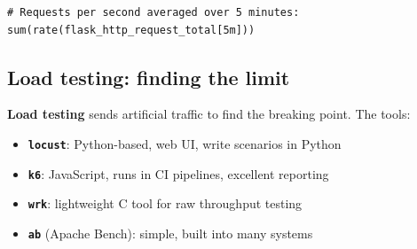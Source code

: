 \begin{outputbox}[short]
\begin{Verbatim}[fontsize=\codesize, breaklines, breakanywhere, breaksymbolleft={\tiny\textcolor{muted}{$\hookrightarrow$}}]
# Requests per second averaged over 5 minutes:
sum(rate(flask_http_request_total[5m]))
\end{Verbatim}
\end{outputbox}

\subsection*{Load testing: finding the limit}\label{36-scaling-load:load-testing-finding-the-limit}

\textbf{Load testing} sends artificial traffic to find the breaking point. The tools:

\begin{itemize}
\tightlist
\item
  \textbf{\texttt{locust}}: Python-based, web UI, write scenarios in Python
\item
  \textbf{\texttt{k6}}: JavaScript, runs in CI pipelines, excellent reporting
\item
  \textbf{\texttt{wrk}}: lightweight C tool for raw throughput testing
\item
  \textbf{\texttt{ab}} (Apache Bench): simple, built into many systems
\end{itemize}

